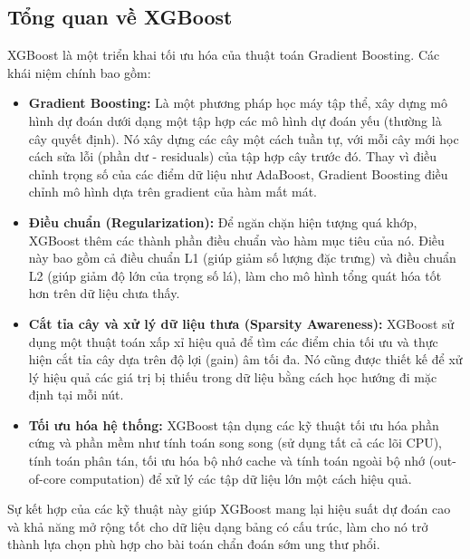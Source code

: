 \subsection{Tổng quan về XGBoost}
XGBoost là một triển khai tối ưu hóa của thuật toán Gradient Boosting. Các khái niệm chính bao gồm:
\begin{itemize}
    \item \textbf{Gradient Boosting:} Là một phương pháp học máy tập thể, xây dựng mô hình dự đoán dưới dạng một tập hợp các mô hình dự đoán yếu (thường là cây quyết định). Nó xây dựng các cây một cách tuần tự, với mỗi cây mới học cách sửa lỗi (phần dư - residuals) của tập hợp cây trước đó. Thay vì điều chỉnh trọng số của các điểm dữ liệu như AdaBoost, Gradient Boosting điều chỉnh mô hình dựa trên gradient của hàm mất mát.
    \item \textbf{Điều chuẩn (Regularization):} Để ngăn chặn hiện tượng quá khớp, XGBoost thêm các thành phần điều chuẩn vào hàm mục tiêu của nó. Điều này bao gồm cả điều chuẩn L1 (giúp giảm số lượng đặc trưng) và điều chuẩn L2 (giúp giảm độ lớn của trọng số lá), làm cho mô hình tổng quát hóa tốt hơn trên dữ liệu chưa thấy.
    \item \textbf{Cắt tỉa cây và xử lý dữ liệu thưa (Sparsity Awareness):} XGBoost sử dụng một thuật toán xấp xỉ hiệu quả để tìm các điểm chia tối ưu và thực hiện cắt tỉa cây dựa trên độ lợi (gain) âm tối đa. Nó cũng được thiết kế để xử lý hiệu quả các giá trị bị thiếu trong dữ liệu bằng cách học hướng đi mặc định tại mỗi nút.
    \item \textbf{Tối ưu hóa hệ thống:} XGBoost tận dụng các kỹ thuật tối ưu hóa phần cứng và phần mềm như tính toán song song (sử dụng tất cả các lõi CPU), tính toán phân tán, tối ưu hóa bộ nhớ cache và tính toán ngoài bộ nhớ (out-of-core computation) để xử lý các tập dữ liệu lớn một cách hiệu quả.
\end{itemize}
Sự kết hợp của các kỹ thuật này giúp XGBoost mang lại hiệu suất dự đoán cao và khả năng mở rộng tốt cho dữ liệu dạng bảng có cấu trúc, làm cho nó trở thành lựa chọn phù hợp cho bài toán chẩn đoán sớm ung thư phổi.

